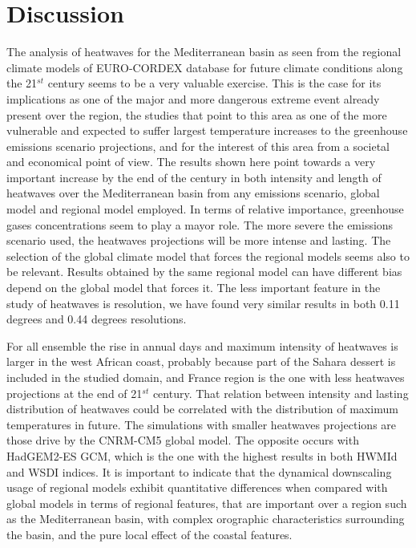 \section{Discussion}

The analysis of heatwaves for the Mediterranean basin as seen from the regional
climate models of EURO-CORDEX database for future climate conditions along
the 21$^{st}$ century seems to be a very valuable exercise. This is the case for its
implications as one of the major and more dangerous extreme event already
present over the region, the studies that point to this area as one
of the more vulnerable and expected to suffer largest temperature increases to
the greenhouse emissions scenario projections, and for the interest
of this area from a societal and economical point of view. The results
shown here point towards a very important increase by the end of the century 
in both intensity and length of heatwaves over the Mediterranean basin from
any emissions scenario, global model and regional model employed.
In terms of relative importance, greenhouse gases concentrations seem to
play a mayor role. The more severe the emissions scenario used,  the heatwaves projections will be more intense and lasting. The selection of the global climate model that forces the regional models seems also to be relevant. 
Results obtained by the same regional model can have different bias depend on the global model that forces it. 
The less important feature in the study of heatwaves is resolution, we have found very similar results in both 0.11 degrees and 0.44 degrees resolutions. 

For all ensemble the rise in annual days and maximum intensity of heatwaves is larger in the west African coast, probably because part of the Sahara dessert is included in the studied domain, and France region is the one with less heatwaves projections at the end of 21$^{st}$ century. That relation between intensity and lasting distribution of heatwaves could be correlated with the distribution of maximum temperatures in future. The simulations with smaller heatwaves projections are those drive by the CNRM-CM5 global model. The opposite occurs with HadGEM2-ES GCM, which is the one with the highest results in both HWMId and WSDI indices. 
It is important to indicate that the dynamical downscaling usage of regional models exhibit quantitative differences when compared with global models in terms of regional features, that are important over a
region such as the Mediterranean basin, with complex orographic characteristics
surrounding the basin, and the pure local effect of the coastal features.

